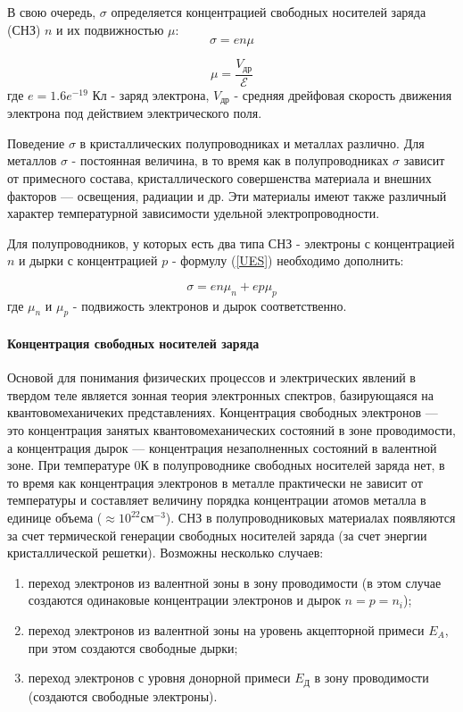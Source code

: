 В свою очередь, $\sigma$ определяется концентрацией свободных носителей заряда (СНЗ) $n$ и их подвижностью $\mu$:
\begin{equation}
\sigma = e n \mu
\label{UES}
\end{equation}

\begin{equation}
\mu = \frac{V_{\text{др}}}{\mathcal{E}}
\label{mu_from_Vdr}
\end{equation}
где $e = 1.6e^{-19}$ Кл - заряд электрона, $V_{\text{др}}$ - средняя дрейфовая скорость движения электрона под действием электрического поля.

Поведение $\sigma$ в кристаллических полупроводниках и металлах различно. Для металлов $\sigma$ - постоянная величина, в то время как в полупроводниках $\sigma$ зависит от примесного состава, кристаллического совершенства материала и внешних факторов — освещения, радиации и др. Эти материалы имеют также различный характер температурной зависимости удельной электропроводности.

Для полупроводников, у которых есть два типа СНЗ - электроны с концентрацией $n$ и дырки с концентрацией $p$ - формулу (\ref{UES}) необходимо дополнить:

\begin{equation}
\sigma = e n \mu_{n} + e p \mu_{p}
\end{equation}
где $\mu_{n}$ и $\mu_{p}$ - подвижость электронов и дырок соответственно.

\paragraph{Концентрация свободных носителей заряда}

Основой для понимания физических процессов и электрических явлений в твердом теле является зонная теория электронных спектров, базирующаяся на квантовомеханичеких представлениях. Концентрация свободных электронов — это концентрация занятых квантовомеханических состояний в зоне проводимости, а концентрация дырок — концентрация незаполненных состояний в валентной зоне. При температуре 0\textdegree К в полупроводнике свободных носителей заряда нет, в то время как концентрация электронов в металле практически не зависит от температуры и составляет величину порядка концентрации атомов металла в единице объема ($\approx 10^{22} \text{см}^{-3}$). СНЗ в полупроводниковых материалах появляются за счет термической генерации свободных носителей заряда (за счет энергии кристаллической решетки). Возможны несколько случаев:
\begin{enumerate}
\item переход электронов из валентной зоны в зону проводимости (в этом случае создаются одинаковые концентрации электронов и дырок $n = p = n_{i}$);
\item переход электронов из валентной зоны на уровень акцепторной примеси $E_{A}$, при этом создаются свободные дырки;
\item переход электронов с уровня донорной примеси $E_{\text{Д}}$ в зону проводимости (создаются свободные электроны).
\end{enumerate}

